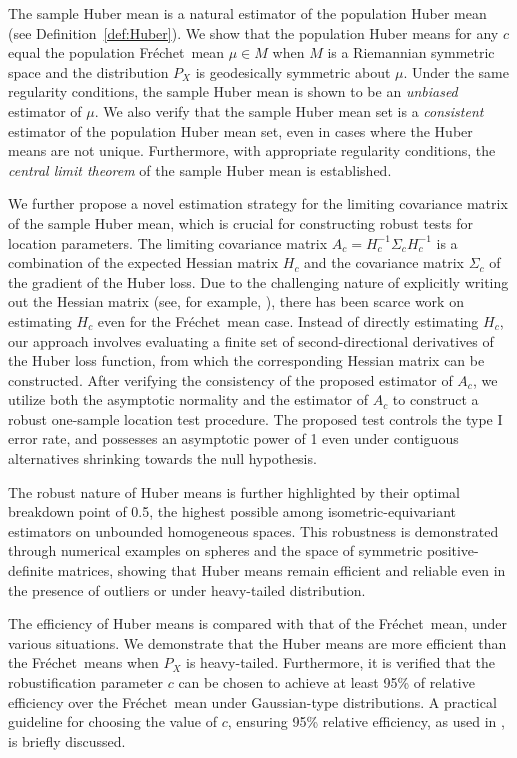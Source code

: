 \documentclass[preprint]{imsart}
\def\Frechet{Fr\'{e}chet}
\theoremstyle{plain}
\theoremstyle{remark}
\begin{document}
The sample Huber mean is a natural estimator of the population Huber mean (see Definition~\ref{def:Huber}). We show that the population Huber means for any $c$ equal the population \Frechet\ mean $\mu \in M$ when $M$ is a Riemannian symmetric space and the distribution $P_X$ is geodesically symmetric about $\mu$. Under the same regularity conditions, the sample Huber mean is shown to be an \textit{unbiased} estimator of $\mu$. We also verify that the sample Huber mean set is a \textit{consistent} estimator of the population Huber mean set, even in cases where the Huber means are not unique. Furthermore, with appropriate regularity conditions, the \textit{central limit theorem} of the sample Huber mean is established. 

 

We further propose a novel estimation strategy for the limiting covariance matrix of the sample Huber mean, which is crucial for constructing robust tests for location parameters. The limiting covariance matrix  $A_c = H_c^{-1} \Sigma_c H_c^{-1}$ is a combination of the expected Hessian matrix $H_c$ and the covariance matrix $\Sigma_c$ of the gradient of the Huber loss. Due to the challenging nature of explicitly writing out the Hessian matrix (see, for example, \cite{bhattacharya2008statistics, pennec2018barycentric,pennec2019curvature}), there has been scarce work on estimating $H_c$ even for the \Frechet\ mean case. Instead of directly estimating $H_c$, our approach involves evaluating a finite set of second-directional derivatives of the Huber loss function, from which the corresponding Hessian matrix can be constructed. After verifying the consistency of the proposed estimator of $A_c$, we utilize both the asymptotic normality and the estimator of $A_c$ to construct a robust one-sample location test procedure. The proposed test controls the type I error rate, and possesses an asymptotic power of 1 even under contiguous alternatives shrinking towards the null hypothesis.  

The robust nature of Huber means is further highlighted by their optimal breakdown point of 0.5, the highest possible among isometric-equivariant estimators on unbounded homogeneous spaces. This robustness is demonstrated through numerical examples on spheres and the space of symmetric positive-definite matrices, showing that Huber means remain efficient and reliable even in the presence of outliers or under heavy-tailed distribution. 

The efficiency of Huber means is compared with that of the \Frechet\ mean, under various situations. We demonstrate that the Huber means are more efficient than the \Frechet\ means when $P_X$ is heavy-tailed. Furthermore, it is verified that the robustification parameter $c$ can be chosen to achieve at least 95\% of relative efficiency over the \Frechet\ mean under Gaussian-type distributions. A practical guideline for choosing the value of $c$, ensuring 95\% relative efficiency, as used in \cite{holland1977robust}, is briefly discussed.
\end{document}
